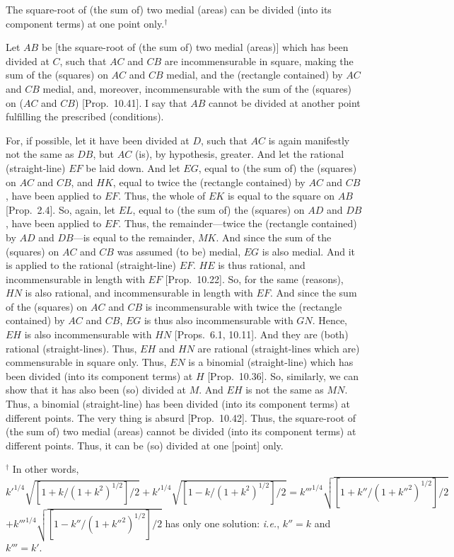 \begin{Parallel}{}{}
{The square-root of (the sum of) two medial (areas) can be
divided (into its component terms) at one point only.$^\dag$

\epsfysize=2in
\centerline{}

Let $AB$ be [the square-root of (the sum of) two medial (areas)] which has been divided
at $C$, such that $AC$ and $CB$ are incommensurable in square, making the
sum of the (squares) on $AC$ and $CB$ medial, and the (rectangle contained) by $AC$ and $CB$ medial, and, moreover, incommensurable
with the sum of the (squares) on ($AC$ and $CB$) [Prop.~10.41]. I say that $AB$ cannot be divided
at another point fulfilling the prescribed (conditions).

For, if possible, let it have been divided at $D$, such that $AC$ is again
manifestly not the same as $DB$, but $AC$ (is), by hypothesis, greater.
And let the rational (straight-line) $EF$ be laid down. And let $EG$,
equal to (the sum of) the (squares) on $AC$ and $CB$, and $HK$, equal to twice the (rectangle contained) by $AC$ and $CB$,
have been applied to $EF$. Thus, the whole of $EK$ is equal to the
square on $AB$ [Prop.~2.4]. So, again, let $EL$, equal to (the sum of) the (squares)
on $AD$ and $DB$, have been applied to $EF$. Thus, the remainder---twice
the (rectangle contained) by $AD$ and $DB$---is equal to the remainder, $MK$. And since the sum of the (squares) on $AC$ and $CB$
was assumed (to be) medial, $EG$ is also medial. And it is applied
to the rational (straight-line) $EF$. $HE$ is thus rational, and incommensurable in length with $EF$ [Prop.~10.22].  So, for the same (reasons), 
$HN$ is also rational, and incommensurable in length with $EF$.
And since the sum of the (squares) on $AC$ and $CB$ is incommensurable
with twice the (rectangle contained) by $AC$ and $CB$, $EG$ is thus also
incommensurable with $GN$. Hence, $EH$ is also incommensurable with
$HN$ [Props.~6.1, 10.11].
And they are (both) rational (straight-lines). Thus, $EH$ and $HN$ are rational
(straight-lines which are) commensurable in  square only. Thus, $EN$
is a binomial (straight-line) which has been divided (into its component
terms) at $H$ [Prop.~10.36]. So, similarly, we can show that
it has also been (so) divided at $M$. And $EH$ is not the same  as $MN$. Thus,
a binomial (straight-line) has been divided (into its component
terms) at different points. The
very thing is absurd [Prop.~10.42]. Thus,
the square-root of (the sum of) two medial (areas) cannot be divided (into its component terms) at different
points. Thus, it can be (so) divided at one [point] only.}
\end{Parallel}
{\footnotesize\noindent$^\dag$ In other words, $k'^{1/4}\sqrt{[1+k/(1+k^2)^{1/2}]/2}
+k'^{1/4}\sqrt{[1-k/(1+k^2)^{1/2}]/2}=k'''^{1/4}\sqrt{[1+k''/(1+k''^2)^{1/2}]/2}$\\$
+k'''^{1/4}\sqrt{[1-k''/(1+k''^2)^{1/2}]/2}$ has only one solution: {\em i.e.}, $k''=k$ and $k'''=k'$.}


